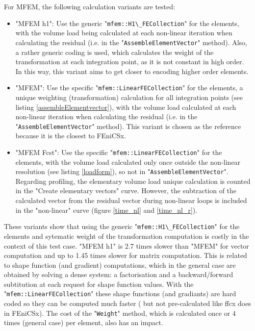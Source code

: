 \documentclass[12pt]{article}
\newcommand{\f}[1]{FEniCSx#1}
\newcommand{\mycode}[1]{\textsf{"}\lstinline`#1`\textsf{"}}
\begin{document}
\bigskip
For MFEM, the following calculation variants are tested:
\begin{itemize}
	\item "{\color{MFEMDarkGreen}MFEM h1}": Use the generic  \mycode{mfem::H1\_FECollection} for the elements, with the volume load being calculated at each non-linear iteration when calculating the residual (i.e. in the \mycode{AssembleElementVector} method). Also, a rather generic coding is used, which calculates the weight of the transformation at each integration point, as it is not constant in high order. 
	In this way, this variant aims to get closer to encoding higher order elements. 
	\item "{\color{MFEMGreen}MFEM}": Use the specific \mycode{mfem::LinearFECollection} for the elements, a unique weighting (transformation) calculation for all integration points (see listing \ref{assembleElementvector}), with the volume load calculated at each non-linear iteration when calculating the residual (i.e. in the \mycode{AssembleElementVector} method). This variant is chosen as the reference because it is the closest to \f{}.
	\item "{\color{MFEMForestGreen}MFEM Fcst}": Use the specific \mycode{mfem::LinearFECollection} for the elements, with the volume load calculated only once outside the non-linear resolution (see listing \ref{loadform}), so not in \mycode{AssembleElementVector}. 
	Regarding profiling, the elementary volume load unique calculation is counted in the "Create elementary vectors" curve.
	 However, the subtraction of the calculated vector from the residual vector during non-linear loops is included in the "non-linear" curve (figure \ref{time_nl} and \ref{time_nl_r}).
\end{itemize} 
These variants show that using the generic \mycode{mfem::H1\_FECollection} for the elements and sytematic weight of the transformation computation is costly in the context of this test case.
"{\color{MFEMDarkGreen}MFEM h1}" is 2.7 times slower than "{\color{MFEMGreen}MFEM}" for vector computation and up to 1.45 times slower for matrix computation.
This is related to shape function (and gradient) computations, which in the general case are obtained by solving a dense system: a factorisation and a backward/forward subtitution at each request for shape function values.
With the \mycode{mfem::LinearFECollection} these shape functions (and gradiants) are hard coded so they can be computed much faster ( but not pre-calculated like ffcx does in \f{}).
The cost of the \mycode{Weight} method, which is calculated once or 4 times (general case) per element, also has an impact. 
\end{document}
